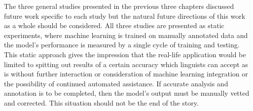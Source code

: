 

The three general studies presented in the previous three chapters discussed future work specific to each study but the natural future directions of this work as a whole should be considered. All three studies are presented as static experiments, where machine learning is trained on manually annotated data and the model's performance is measured by a single cycle of training and testing. This static approach gives the impression that the real-life application would be limited to spitting out results of a certain accuracy which linguists can accept as is without further interaction or consideration of machine learning integration or the possibility of continued automated assistance. If accurate analysis and annotation is to be completed, then the model's output must be manually vetted and corrected. This situation should not be the end of the story. 

